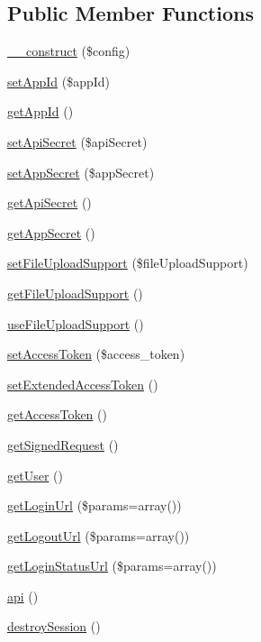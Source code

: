 \subsection*{Public Member Functions}
\begin{DoxyCompactItemize}
\item 
\hyperlink{classBaseFacebook_af8ca4863484827e521f5052f5dfed642}{\-\_\-\-\_\-construct} (\$config)
\item 
\hyperlink{classBaseFacebook_a4691675e86f0fdba08118a0a50d16999}{set\-App\-Id} (\$app\-Id)
\item 
\hyperlink{classBaseFacebook_a1a3ad028a497dede716cb101f779a15c}{get\-App\-Id} ()
\item 
\hyperlink{classBaseFacebook_afafa43cb0a481b084ae523a04e816016}{set\-Api\-Secret} (\$api\-Secret)
\item 
\hyperlink{classBaseFacebook_ac25a51d73a78e3d3308523fc03c93a05}{set\-App\-Secret} (\$app\-Secret)
\item 
\hyperlink{classBaseFacebook_ab97bde45113f0c14d1c42c154e39ecf5}{get\-Api\-Secret} ()
\item 
\hyperlink{classBaseFacebook_ae53e6a3cfd3b6ca1dba5c1f5568720ec}{get\-App\-Secret} ()
\item 
\hyperlink{classBaseFacebook_a9cd44296e92bd602f54c26d613decefc}{set\-File\-Upload\-Support} (\$file\-Upload\-Support)
\item 
\hyperlink{classBaseFacebook_a339321887bccd3b1ebc79c433ed97409}{get\-File\-Upload\-Support} ()
\item 
\hyperlink{classBaseFacebook_a21f5271bcb490f3c415923ce956d61ad}{use\-File\-Upload\-Support} ()
\item 
\hyperlink{classBaseFacebook_a3844fd3db938af8c4d37ed1edeea3ed5}{set\-Access\-Token} (\$access\-\_\-token)
\item 
\hyperlink{classBaseFacebook_ae3043ae251526169b4780a569d8f6e2f}{set\-Extended\-Access\-Token} ()
\item 
\hyperlink{classBaseFacebook_a1cdac89b20b87c2c2a20137e5e7a8f17}{get\-Access\-Token} ()
\item 
\hyperlink{classBaseFacebook_adf3c753e09842db169309daf8713d17a}{get\-Signed\-Request} ()
\item 
\hyperlink{classBaseFacebook_a8a3ed9483d09400ec486232401189cba}{get\-User} ()
\item 
\hyperlink{classBaseFacebook_ad8f74c26c7a9bcb82dfe3a411419b553}{get\-Login\-Url} (\$params=array())
\item 
\hyperlink{classBaseFacebook_a8083255cc3de8af470925baebccffae2}{get\-Logout\-Url} (\$params=array())
\item 
\hyperlink{classBaseFacebook_a3ac3ec2796290a2e3e4d511bbe76abee}{get\-Login\-Status\-Url} (\$params=array())
\item 
\hyperlink{classBaseFacebook_a22d6a4c1b6dec331c3bc3f7af02849f5}{api} ()
\item 
\hyperlink{classBaseFacebook_a4235356d20fcc14a74c1073b59948b65}{destroy\-Session} ()
\end{DoxyCompactItemize}
